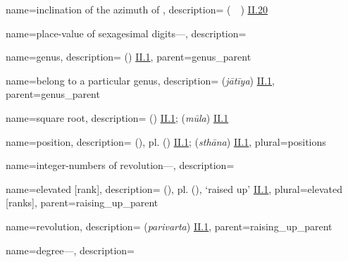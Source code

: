 
{
        name={inclination of the azimuth of \qibla},
        description={ (\inhiraf\idafaconsonant\ \samt\idafaconsonant\ \qibla) \hyperlink{Pii20}{II.20}}
}


{
        name={place-value of sexagesimal digits---},
        description={\phantom{x}\nopagebreak}
}

{
        name={genus},
        description={ (\jins) \hyperlink{Pii1}{II.1}},
        parent={genus_parent}
}

{
        name={belong to a particular genus},
        description={ (\textit{jātīya}) \hyperlink{Sii1}{II.1}},
        parent={genus_parent}
}


{
        name={square root},
        description={ (\jadr) \hyperlink{Pii1}{II.1};  (\textit{mūla}) \hyperlink{Sii1}{II.1}}
}

{
        name={position},
        description={ (\martaba), pl.\thinspace {} (\maratib) \hyperlink{Pii1}{II.1};   (\textit{sthāna}) \hyperlink{Sii1}{II.1}},
        plural={positions}        
}

{
        name={integer-numbers of revolution---},
        description={\phantom{x}\nopagebreak}
}

{
        name={elevated [rank]},
        description={ (\marfu), pl.\thinspace {} (\marfuat), \lit `raised up' \hyperlink{Pii1}{II.1}},
        plural={elevated [ranks]},
        parent={raising_up_parent}
}

{
        name={revolution},
        description={ (\textit{parivarta}) \hyperlink{Sii1}{II.1}},
        parent={raising_up_parent}
}

{
        name={degree---},
        description={\phantom{x}\nopagebreak}
}

